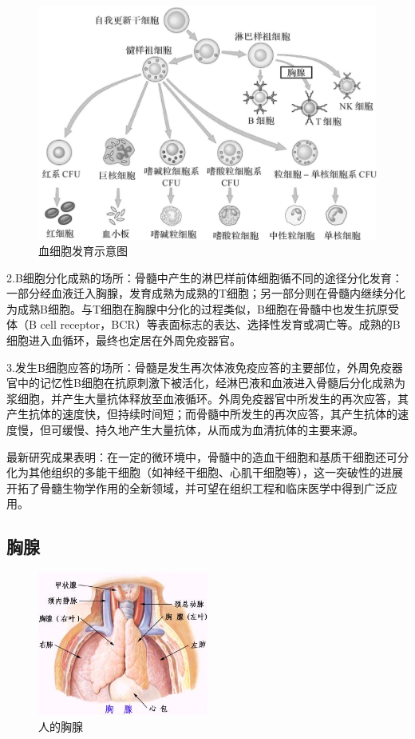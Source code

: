 \begin{figure}[!htbp]
 \centering
 \includegraphics[width=.6\textwidth]{./images/Image00029.jpg}
 \caption{血细胞发育示意图}
 \label{fig2-4}
  \end{figure} 

2.B细胞分化成熟的场所：骨髓中产生的淋巴样前体细胞循不同的途径分化发育：一部分经血液迁入胸腺，发育成熟为成熟的T细胞；另一部分则在骨髓内继续分化为成熟B细胞。与T细胞在胸腺中分化的过程类似，B细胞在骨髓中也发生抗原受体（B
cell
receptor，BCR）等表面标志的表达、选择性发育或凋亡等。成熟的B细胞进入血循环，最终也定居在外周免疫器官。

3.发生B细胞应答的场所：骨髓是发生再次体液免疫应答的主要部位，外周免疫器官中的记忆性B细胞在抗原刺激下被活化，经淋巴液和血液进入骨髓后分化成熟为浆细胞，并产生大量抗体释放至血液循环。外周免疫器官中所发生的再次应答，其产生抗体的速度快，但持续时间短；而骨髓中所发生的再次应答，其产生抗体的速度慢，但可缓慢、持久地产生大量抗体，从而成为血清抗体的主要来源。

最新研究成果表明：在一定的微环境中，骨髓中的造血干细胞和基质干细胞还可分化为其他组织的多能干细胞（如神经干细胞、心肌干细胞等），这一突破性的进展开拓了骨髓生物学作用的全新领域，并可望在组织工程和临床医学中得到广泛应用。


\subsection{胸腺}

\begin{figure}[!htbp]
 \centering
 \includegraphics[width=0.5\textwidth]{./images/Image00030.jpg}
 \caption{人的胸腺}
 \label{fig2-5}
  \end{figure} 

